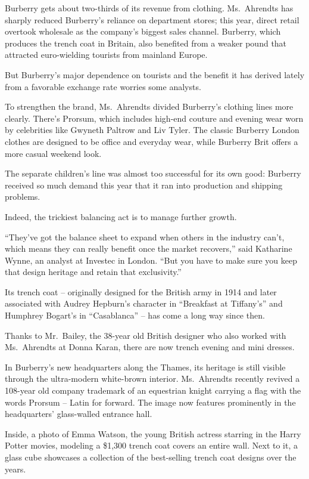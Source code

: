 ﻿\documentclass[12pt]{article}
\begin{document}
Burberry gets about two-thirds of its revenue from clothing. Ms.~Ahrendts has sharply reduced
Burberry's reliance on department stores; this year, direct retail overtook wholesale as the
company's biggest sales channel. Burberry, which produces the trench coat in Britain, also benefited
from a weaker pound that attracted euro-wielding tourists from mainland Europe.

But Burberry's major dependence on tourists and the benefit it has derived lately from a favorable
exchange rate worries some analysts.

To strengthen the brand, Ms.~Ahrendts divided Burberry's clothing lines more clearly. There's
Prorsum, which includes high-end couture and evening wear worn by celebrities like Gwyneth Paltrow
and Liv Tyler. The classic Burberry London clothes are designed to be office and everyday wear,
while Burberry Brit offers a more casual weekend look.

The separate children's line was almost too successful for its own good: Burberry received so much
demand this year that it ran into production and shipping problems.

Indeed, the trickiest balancing act is to manage further growth.

``They've got the balance sheet to expand when others in the industry can't, which means they can
really benefit once the market recovers,'' said Katharine Wynne, an analyst at Investec in London.
``But you have to make sure you keep that design heritage and retain that exclusivity.''

Its trench coat -- originally designed for the British army in 1914 and later associated with Audrey
Hepburn's character in ``Breakfast at Tiffany's'' and Humphrey Bogart's in ``Casablanca'' -- has
come a long way since then.

Thanks to Mr.~Bailey, the 38-year old British designer who also worked with Ms.~Ahrendts at Donna
Karan, there are now trench evening and mini dresses.

In Burberry's new headquarters along the Thames, its heritage is still visible through the
ultra-modern white-brown interior. Ms.~Ahrendts recently revived a 108-year old company trademark of
an equestrian knight carrying a flag with the words Prorsum -- Latin for forward. The image now
features prominently in the headquarters' glass-walled entrance hall.

Inside, a photo of Emma Watson, the young British actress starring in the Harry Potter movies,
modeling a \$1,300 trench coat covers an entire wall. Next to it, a glass cube showcases a
collection of the best-selling trench coat designs over the years.
\end{document}

